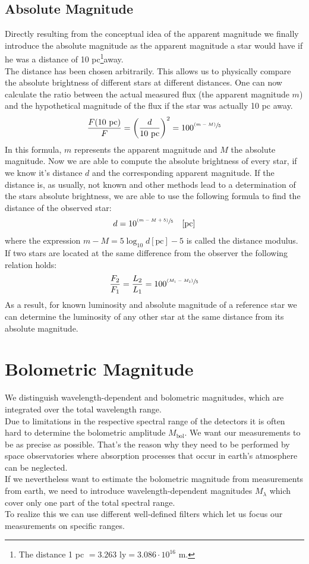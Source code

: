 \subsection{Absolute Magnitude}
Directly resulting from the conceptual idea of the apparent magnitude we finally introduce the absolute magnitude as the apparent magnitude a star would have if he was a distance of 10 pc\footnote{The distance 1 pc $= 3.263 \text{ ly} = 3.086 \cdot 10^{16}$ m.}away. \\
The distance has been chosen arbitrarily. This allows us to physically compare the absolute brightness of different stars at different distances. One can now calculate the ratio between the actual measured flux (the apparent magnitude $m$) and the hypothetical magnitude of the flux if the star was actually 10 pc away. 
\begin{align}
	\frac{F(10 \text{ pc})}{F} = \left( \frac{d}{10 \text{ pc}} \right)^2 = 100^{\sfrac{(m-M)}{5}}
\end{align}
In this formula, $m$ represents the apparent magnitude and $M$ the absolute magnitude. Now we are able to compute the absolute brightness of every star, if we know it's distance $d$ and the corresponding apparent magnitude. If the distance is, as usually, not known and other methods lead to a determination of the stars absolute brightness, we are able to use the following formula to find the distance of the observed star:
\begin{align}
	d = 10^{\sfrac{(m-M+5)}{5}} \quad [\text{pc}]
\end{align}
where the expression $m-M = 5\operatorname{log}_{10} d[\text{pc}] - 5$ is called the distance modulus. \\
If two stars are located at the same difference from the observer the following relation holds: 
\begin{align}
	\frac{F_2}{F_1} = \frac{L_2}{L_1} = 100^{\sfrac{(M_1-M_2)}{5}}
\end{align}
As a result, for known luminosity and absolute magnitude of a reference star we can determine the luminosity of any other star at the same distance from its absolute magnitude.
\section{Bolometric Magnitude}
We distinguish wavelength-dependent and bolometric magnitudes, which are integrated over the total wavelength range. \\ 
Due to limitations in the respective spectral range of the detectors it is often hard to determine the bolometric amplitude $M_{\text{bol}}$. We want our measurements to be as precise as possible. That's the reason why they need to be performed by space observatories where absorption processes  that occur in earth's atmosphere can be neglected. \\
If we nevertheless want to estimate the bolometric magnitude from measurements from earth, we need to introduce wavelength-dependent magnitudes $M_{\lambda}$ which cover only one part of the total spectral range. \\
 To realize this we can use different well-defined filters which let us focus our measurements on specific ranges. \\
 
